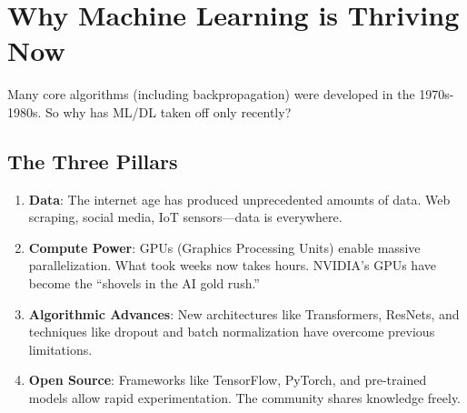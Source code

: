 
\section{Why Machine Learning is Thriving Now}

Many core algorithms (including backpropagation) were developed in the 1970s-1980s. So why has ML/DL taken off only recently?

\subsection{The Three Pillars}

\begin{center}
\end{center}

\begin{enumerate}
    \item \textbf{Data}: The internet age has produced unprecedented amounts of data. Web scraping, social media, IoT sensors---data is everywhere.
    
    \item \textbf{Compute Power}: GPUs (Graphics Processing Units) enable massive parallelization. What took weeks now takes hours. NVIDIA's GPUs have become the ``shovels in the AI gold rush.''
    
    \item \textbf{Algorithmic Advances}: New architectures like Transformers, ResNets, and techniques like dropout and batch normalization have overcome previous limitations.
    
    \item \textbf{Open Source}: Frameworks like TensorFlow, PyTorch, and pre-trained models allow rapid experimentation. The community shares knowledge freely.
\end{enumerate}

